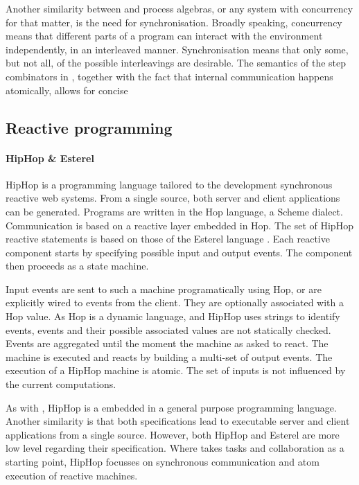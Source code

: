Another similarity between \TOPHAT and process algebras, or any system with concurrency for that matter, is the need for synchronisation.
Broadly speaking, concurrency means that different parts of a program can interact with the environment independently, in an interleaved manner.
Synchronisation means that only some, but not all, of the possible interleavings are desirable.
The semantics of the step combinators in \TOPHAT, together with the fact that internal communication happens atomically, allows for concise 



\subsection{Reactive programming}

\paragraph{HipHop \& Esterel}

HipHop \cite{berry2011hiphop,journals/corr/BerryS13} is a programming language tailored to the development synchronous reactive web systems.
From a single source, both server and client applications can be generated.
Programs are written in the Hop language, a Scheme dialect.
Communication is based on a reactive layer embedded in Hop.
The set of HipHop reactive statements is based on those of the Esterel language \cite{boussinot1991esterel,journals/scp/BerryG92}.
Each reactive component starts by specifying possible input and output events.
The component then proceeds as a state machine.

Input events are sent to such a machine programatically using Hop, or are explicitly wired to events from the client.
They are optionally associated with a Hop value.
As Hop is a dynamic language, and HipHop uses strings to identify events, events and their possible associated values are not statically checked.
Events are aggregated until the moment the machine as asked to react.
The machine is executed and reacts by building a multi-set of output events.
The execution of a HipHop machine is atomic.
The set of inputs is not influenced by the current computations.

As with \TOPHAT, HipHop is a \DSL embedded in a general purpose programming language.
Another similarity is that both specifications lead to executable server and client applications from a single source.
However, both HipHop and Esterel are more low level regarding their specification.
Where \TOPHAT takes tasks and collaboration as a starting point,
HipHop focusses on synchronous communication and atom execution of reactive machines.

